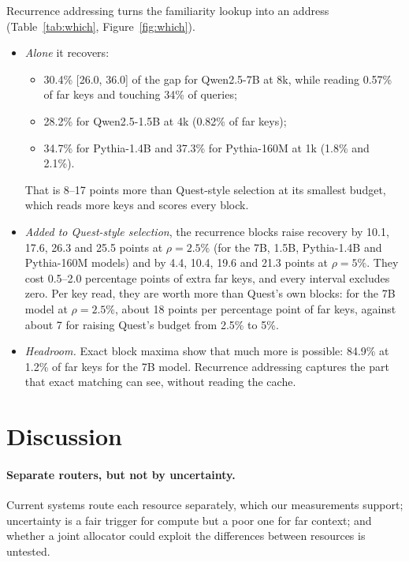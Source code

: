 \documentclass[11pt]{article}
\begin{document}
Recurrence addressing turns the familiarity lookup into an address (Table~\ref{tab:which}, Figure~\ref{fig:which}).
\begin{itemize}
\item \emph{Alone} it recovers:
  \begin{itemize}
  \item 30.4\% [26.0, 36.0] of the gap for Qwen2.5-7B at 8k, while reading 0.57\% of far keys and touching 34\% of queries;
  \item 28.2\% for Qwen2.5-1.5B at 4k (0.82\% of far keys);
  \item 34.7\% for Pythia-1.4B and 37.3\% for Pythia-160M at 1k (1.8\% and 2.1\%).
  \end{itemize}
  That is 8--17 points more than Quest-style selection at its smallest budget, which reads more keys and scores every block.
\item \emph{Added to Quest-style selection}, the recurrence blocks raise recovery by 10.1, 17.6, 26.3 and 25.5 points at $\rho=2.5\%$ (for the 7B, 1.5B, Pythia-1.4B and Pythia-160M models) and by 4.4, 10.4, 19.6 and 21.3 points at $\rho=5\%$. They cost 0.5--2.0 percentage points of extra far keys, and every interval excludes zero. Per key read, they are worth more than Quest's own blocks: for the 7B model at $\rho=2.5\%$, about 18 points per percentage point of far keys, against about 7 for raising Quest's budget from 2.5\% to 5\%.
\item \emph{Headroom.} Exact block maxima show that much more is possible: 84.9\% at 1.2\% of far keys for the 7B model. Recurrence addressing captures the part that exact matching can see, without reading the cache.
\end{itemize}

\section{Discussion}\label{sec:discussion}

\paragraph{Separate routers, but not by uncertainty.} Current systems route each resource separately, which our measurements support; uncertainty is a fair trigger for compute but a poor one for far context; and whether a joint allocator could exploit the differences between resources is untested.
\end{document}
